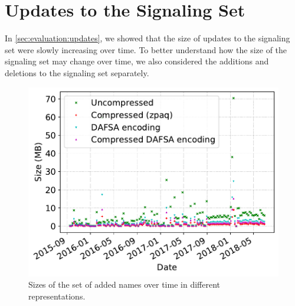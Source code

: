 

\section{Updates to the Signaling Set}
\label{sec:updates}

In \autoref{sec:evaluation:updates}, we showed that the size of updates to the
signaling set were slowly increasing over time. To better understand how the
size of the signaling set may change over time, we also considered the additions
and deletions to the signaling set separately.

\begin{figure}[t]
  \centering
  \includegraphics[width=0.95\linewidth]{fig/added_name_set_size}
  \caption{Sizes of the set of added names over time in different
  representations.}
  \label{fig:updates:added}
\end{figure}

